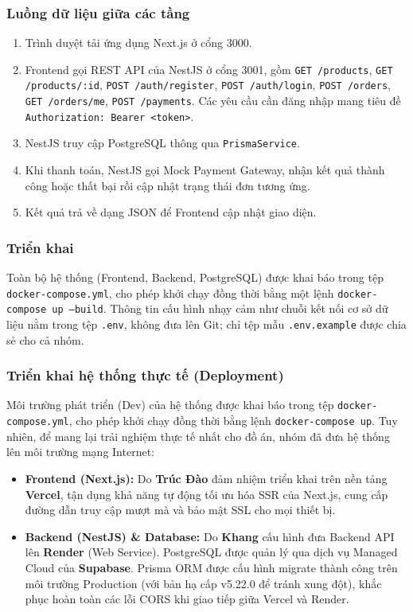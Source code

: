 \subsubsection{Luồng dữ liệu giữa các tầng}

\begin{enumerate}
  \item Trình duyệt tải ứng dụng Next.js ở cổng 3000.
  \item Frontend gọi REST API của NestJS ở cổng 3001, gồm \texttt{GET /products}, \texttt{GET /products/:id}, \texttt{POST /auth/register}, \texttt{POST /auth/login}, \texttt{POST /orders}, \texttt{GET /orders/me}, \texttt{POST /payments}. Các yêu cầu cần đăng nhập mang tiêu đề \texttt{Authorization: Bearer <token>}.
  \item NestJS truy cập PostgreSQL thông qua \texttt{PrismaService}.
  \item Khi thanh toán, NestJS gọi Mock Payment Gateway, nhận kết quả thành công hoặc thất bại rồi cập nhật trạng thái đơn tương ứng.
  \item Kết quả trả về dạng JSON để Frontend cập nhật giao diện.
\end{enumerate}

\subsubsection{Triển khai}

Toàn bộ hệ thống (Frontend, Backend, PostgreSQL) được khai báo trong tệp \texttt{docker-compose.yml}, cho phép khởi chạy đồng thời bằng một lệnh \texttt{docker-compose up --build}. Thông tin cấu hình nhạy cảm như chuỗi kết nối cơ sở dữ liệu nằm trong tệp \texttt{.env}, không đưa lên Git; chỉ tệp mẫu \texttt{.env.example} được chia sẻ cho cả nhóm.

\subsubsection{Triển khai hệ thống thực tế (Deployment)}
Môi trường phát triển (Dev) của hệ thống được khai báo trong tệp \texttt{docker-compose.yml}, cho phép khởi chạy đồng thời bằng lệnh \texttt{docker-compose up}. Tuy nhiên, để mang lại trải nghiệm thực tế nhất cho đồ án, nhóm đã đưa hệ thống lên môi trường mạng Internet:
\begin{itemize}
    \item \textbf{Frontend (Next.js):} Do \textbf{Trúc Đào} đảm nhiệm triển khai trên nền tảng \textbf{Vercel}, tận dụng khả năng tự động tối ưu hóa SSR của Next.js, cung cấp đường dẫn truy cập mượt mà và bảo mật SSL cho mọi thiết bị.
    \item \textbf{Backend (NestJS) \& Database:} Do \textbf{Khang} cấu hình đưa Backend API lên \textbf{Render} (Web Service). PostgreSQL được quản lý qua dịch vụ Managed Cloud của \textbf{Supabase}. Prisma ORM được cấu hình migrate thành công trên môi trường Production (với bản hạ cấp v5.22.0 để tránh xung đột), khắc phục hoàn toàn các lỗi CORS khi giao tiếp giữa Vercel và Render.
\end{itemize}

